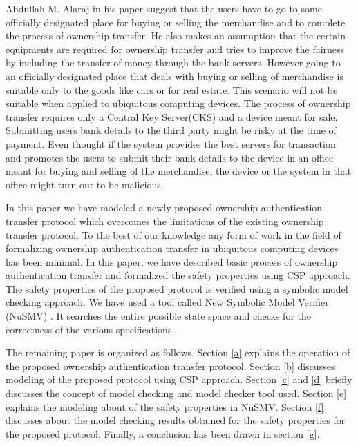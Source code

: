 \documentclass[letterpaper]{article}
\begin{document}
\par
Abdullah M. Alaraj \cite{4} in his paper suggest that the users have to go to some officially designated place for buying or selling the merchandise and to complete the process of ownership transfer. He also makes an assumption that the certain equipments are required for ownership transfer and tries to improve the fairness by including the transfer of money through the bank servers. However going to an officially designated place that deals with buying or selling of merchandise is suitable only to the goods like cars or for real estate. This scenario will not be suitable when applied to ubiquitous computing devices. The process of ownership transfer requires only a Central Key Server(CKS) and a device meant for sale. Submitting users bank details to the third party might be risky at the time of payment. Even thought if the system provides the best servers for transaction and promotes the users to submit their bank details to the device in an office meant for buying and selling of the merchandise, the device or the system in that office might turn out to be malicious. 

\par
In this paper we have modeled a newly proposed ownership authentication transfer protocol \cite{pra}\cite{ps} which overcomes the limitations of the existing ownership transfer protocol. To the best of our knowledge any form of work in the field of formalizing ownership authentication transfer in ubiquitous computing devices has been minimal. In this paper, we have described basic process of ownership authentication transfer and formalized the safety properties using CSP approach. The safety properties of the proposed protocol is verified using a symbolic model checking approach. We have used a tool called New Symbolic Model Verifier (NuSMV) \cite{7}. It searches the entire possible state space and checks for the correctness of the various specifications.

\par
The remaining paper is organized as follows. Section \ref{a} explains the operation of the proposed ownership authentication transfer protocol. Section \ref{b} discusses modeling of the proposed protocol using CSP approach. Section \ref{c} and \ref{d} briefly discusses the concept of model checking and model checker tool used. Section \ref{e} explains the modeling about of the safety properties in NuSMV. Section \ref{f} discusses about the model checking results obtained for the safety properties for the proposed protocol. Finally, a conclusion has been drawn in section \ref{g}.
\end{document}
